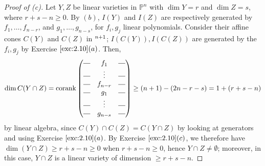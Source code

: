 \documentclass[12pt,letterpaper]{article}
\theoremstyle{definition}
\theoremstyle{remark}
\numberwithin{equation}{section}
\numberwithin{figure}{problem}
\let\AA\relax
\DeclareMathOperator{\AA}{\mathbb{A}}
\newcommand{\PP}{\mathbb{P}}
\begin{document}
\begin{proof}[Proof of (c)]
  Let $Y,Z$ be linear varieties in $\PP^n$ with $\dim Y = r$ and $\dim Z = s$,
  where $r+s-n \ge 0$. By $(b)$, $I(Y)$ and $I(Z)$ are respectively generated by
  $f_1,\ldots,f_{n-r}$, and $g_1,\ldots,g_{n-s}$, for $f_i,g_j$ linear polynomials.
  Consider their affine cones $C(Y)$ and $C(Z)$ in
  $\AA^{n+1}$; $I(C(Y)),I(C(Z))$ are generated by the $f_i,g_j$ by
  Exercise $\ref{exc:2.10}(a)$. Then,
  \begin{equation*}
    \dim C(Y \cap Z) = \operatorname{corank} \begin{pmatrix}
      \rule[.5ex]{1em}{0.4pt} & f_1     & \rule[.5ex]{1em}{0.4pt}\\
      \rule[.5ex]{1em}{0.4pt} & \vdots  & \rule[.5ex]{1em}{0.4pt}\\
      \rule[.5ex]{1em}{0.4pt} & f_{n-r} & \rule[.5ex]{1em}{0.4pt}\\
      \rule[.5ex]{1em}{0.4pt} & g_1     & \rule[.5ex]{1em}{0.4pt}\\
      \rule[.5ex]{1em}{0.4pt} & \vdots  & \rule[.5ex]{1em}{0.4pt}\\
      \rule[.5ex]{1em}{0.4pt} & g_{n-s} & \rule[.5ex]{1em}{0.4pt}
    \end{pmatrix} \ge (n+1) - (2n - r - s) = 1 + (r + s - n)
  \end{equation*}
  by linear algebra, since $C(Y) \cap C(Z) = C(Y \cap Z)$ by looking at
  generators and using Exercise $\ref{exc:2.10}(a)$. By Exercise $\ref{exc:2.10}(c)$,
  we therefore have $\dim (Y \cap Z) \ge r + s - n \ge 0$ when $r + s - n \ge 0$,
  hence $Y \cap Z \ne \emptyset$; moreover, in this case, $Y \cap Z$ is a linear
  variety of dimension $\ge r + s - n$.

\end{proof}
\end{document}

